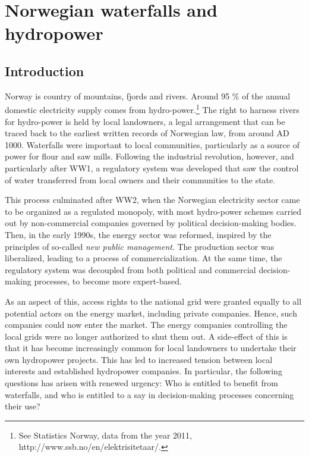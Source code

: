 \chapter{Norwegian waterfalls and hydropower}\label{chap:3}

\section{Introduction}\label{sec:into3}

Norway is country of mountains, fjords and rivers. Around 95 \% of the annual domestic electricity supply comes from hydro-power.\footnote{See Statistics Norway, data from the year 2011, http://www.ssb.no/en/elektrisitetaar/.} The right to harness rivers for hydro-power is held by local landowners, a legal arrangement that can be traced back to the earliest written records of Norwegian law, from around AD 1000. Waterfalls were important to local communities, particularly as a source of power for flour and saw mills. Following the industrial revolution, however, and particularly after WW1, a regulatory system was developed that saw the control of water transferred from local owners and their communities to the state.

This process culminated after WW2, when the Norwegian electricity sector came to be organized as a regulated monopoly, with most hydro-power schemes carried out by non-commercial companies governed by political decision-making bodies. Then, in the early 1990s, the energy sector was reformed, inspired by the principles of so-called {\it new public management}. The production sector was liberalized, leading to a process of commercialization. At the same time, the regulatory system was decoupled from both political and commercial decision-making processes, to become more expert-based.

As an aspect of this, access rights to the national grid were granted equally to all potential actors on the energy market, including private companies. Hence, such companies could now enter the market. The energy companies controlling the local grids were no longer authorized to shut them out. A side-effect of this is that it has become increasingly common for local landowners to undertake their own hydropower projects. This has led to increased tension between local interests and established hydropower companies. In particular, the following questions has arisen with renewed urgency: Who is entitled to benefit from waterfalls, and who is entitled to a say in decision-making processes concerning their use?

